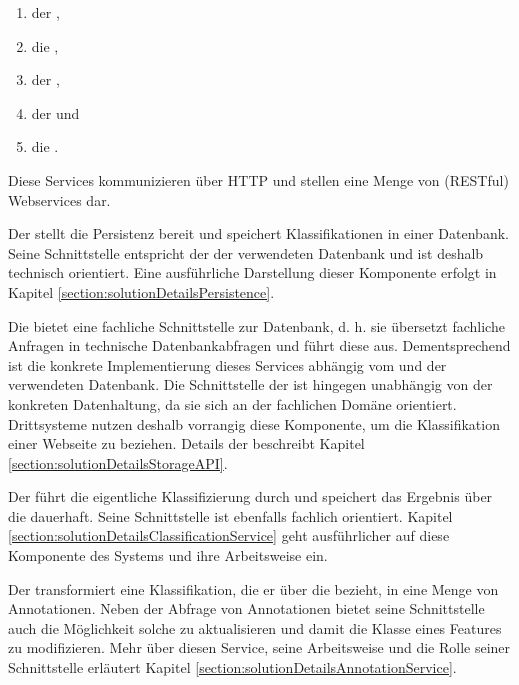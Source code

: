         \begin{enumerate}
            \item der {\classificationStorage},
            \item die {\classificationStorageAPI},
            \item der {\classificationService},
            \item der {\annotationService} und
            \item die {\webAppService}.
        \end{enumerate}

        Diese Services kommunizieren über HTTP
        und stellen eine Menge von (RESTful) Webservices dar.

        Der {\classificationStorage} stellt die Persistenz bereit und speichert
        Klassifikationen in einer Datenbank.
        Seine Schnittstelle entspricht der der verwendeten Datenbank und ist deshalb
        technisch orientiert.
        Eine ausführliche Darstellung dieser Komponente erfolgt in
        Kapitel \ref{section:solutionDetailsPersistence}.

        Die {\classificationStorageAPI} bietet eine fachliche Schnittstelle zur Datenbank,
        d. h. sie übersetzt fachliche Anfragen in technische Datenbankabfragen und führt diese aus.
        Dementsprechend ist die konkrete Implementierung dieses Services abhängig vom {\classificationStorage}
        und der verwendeten Datenbank.
        Die Schnittstelle der {\classificationStorageAPI}
        ist hingegen unabhängig von der konkreten Datenhaltung,
        da sie sich an der fachlichen Domäne orientiert.
        Drittsysteme nutzen deshalb vorrangig diese Komponente, um die Klassifikation einer Webseite zu beziehen.
        Details der {\classificationStorageAPI} beschreibt Kapitel \ref{section:solutionDetailsStorageAPI}.

        Der {\classificationService} führt die eigentliche Klassifizierung durch
        und speichert das Ergebnis über die {\classificationStorageAPI} dauerhaft.
        Seine Schnittstelle ist ebenfalls fachlich orientiert.
        Kapitel \ref{section:solutionDetailsClassificationService} geht ausführlicher auf diese Komponente
        des Systems und ihre Arbeitsweise ein.

        Der {\annotationService} transformiert eine Klassifikation,
        die er über die {\classificationStorageAPI} bezieht,
        in eine Menge von Annotationen.
        Neben der Abfrage von Annotationen bietet seine Schnittstelle auch
        die Möglichkeit solche zu aktualisieren und damit die Klasse eines Features zu modifizieren.
        Mehr über diesen Service, seine Arbeitsweise und die Rolle seiner Schnittstelle
        erläutert Kapitel \ref{section:solutionDetailsAnnotationService}.

